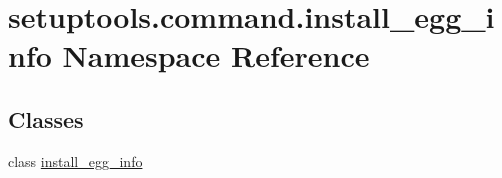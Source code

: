 \hypertarget{namespacesetuptools_1_1command_1_1install__egg__info}{}\section{setuptools.\+command.\+install\+\_\+egg\+\_\+info Namespace Reference}
\label{namespacesetuptools_1_1command_1_1install__egg__info}
\subsection*{Classes}
\begin{DoxyCompactItemize}
\item 
class \hyperlink{classsetuptools_1_1command_1_1install__egg__info_1_1install__egg__info}{install\+\_\+egg\+\_\+info}
\end{DoxyCompactItemize}
